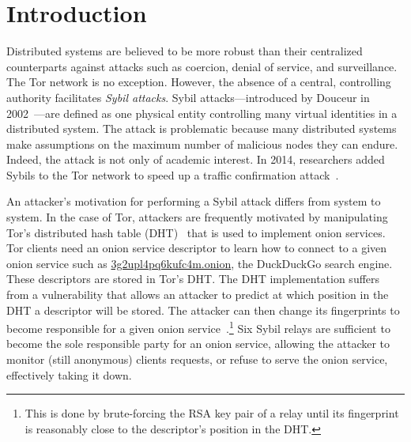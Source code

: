 \section{Introduction}
\label{sec:introduction}

Distributed systems are believed to be more robust than their centralized
counterparts against attacks such as coercion, denial of service, and
surveillance.  The Tor network is no exception.  However, the absence of a
central, controlling authority facilitates \emph{Sybil attacks}.  Sybil
attacks---introduced by Douceur in 2002~\cite{Douceur2002a}---are defined as one
physical entity controlling many virtual identities in a distributed system.
The attack is problematic because many distributed systems make assumptions on
the maximum number of malicious nodes they can endure.  Indeed, the attack is
not only of academic interest.  In 2014, researchers added Sybils to the Tor
network to speed up a traffic confirmation attack~\cite{cmucert}.

An attacker's motivation for performing a Sybil attack differs from system to
system.  In the case of Tor, attackers are frequently motivated by manipulating
Tor's distributed hash table (DHT)~\cite{rendspec} that is used to implement
onion services.  Tor clients need an onion service descriptor to learn how to
connect to a given onion service such as \url{3g2upl4pq6kufc4m.onion}, the
DuckDuckGo search engine.  These descriptors are stored in Tor's DHT.  The DHT
implementation suffers from a vulnerability that allows an attacker to predict
at which position in the DHT a descriptor will be stored.  The attacker can then
change its fingerprints to become responsible for a given onion
service~\cite{Biryukov2013a}.\footnote{This is done by brute-forcing the RSA key
pair of a relay until its fingerprint is reasonably close to the descriptor's
position in the DHT.}  Six Sybil relays are sufficient to become the sole
responsible party for an onion service, allowing the attacker to monitor (still
anonymous) clients requests, or refuse to serve the onion service, effectively
taking it down.

